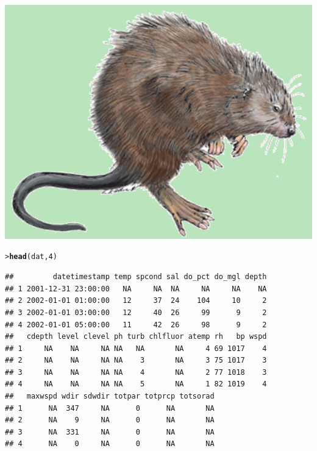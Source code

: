 \documentclass[serif]{beamer}\usepackage[]{graphicx}\usepackage[]{color}
\makeatletter
\newcommand{\hlnum}[1]{\textcolor[rgb]{0.686,0.059,0.569}{#1}}%
\newcommand{\hlstd}[1]{\textcolor[rgb]{0.345,0.345,0.345}{#1}}%
\newcommand{\hlkwd}[1]{\textcolor[rgb]{0.737,0.353,0.396}{\textbf{#1}}}%
\newenvironment{kframe}{%
 \def\at@end@of@kframe{}%
 \ifinner\ifhmode%
  \def\at@end@of@kframe{\end{minipage}}%
  \begin{minipage}{\columnwidth}%
 \fi\fi%
 \def\FrameCommand##1{\hskip\@totalleftmargin \hskip-\fboxsep
 \colorbox{shadecolor}{##1}\hskip-\fboxsep
     \hskip-\linewidth \hskip-\@totalleftmargin \hskip\columnwidth}%
 \MakeFramed {\advance\hsize-\width
   \@totalleftmargin\z@ \linewidth\hsize
   \@setminipage}}%
 {\par\unskip\endMakeFramed%
 \at@end@of@kframe}
\newenvironment{knitrout}{}{} %
\makeatother
\begin{document}
\begin{frame}[fragile]{\includegraphics[width=0.05\paperwidth]{fig/muskrat.png}\hspace{0.07in}{\bf SWMPrats.net: The SWMPr package}}
\begin{knitrout}\small
{}\color{fgcolor}\begin{kframe}
\begin{alltt}
\hlstd{> }\hlkwd{head}\hlstd{(dat,} \hlnum{4}\hlstd{)}
\end{alltt}
\begin{verbatim}
##         datetimestamp temp spcond sal do_pct do_mgl depth
## 1 2001-12-31 23:00:00   NA     NA  NA     NA     NA    NA
## 2 2002-01-01 01:00:00   12     37  24    104     10     2
## 3 2002-01-01 03:00:00   12     40  26     99      9     2
## 4 2002-01-01 05:00:00   11     42  26     98      9     2
##   cdepth level clevel ph turb chlfluor atemp rh   bp wspd
## 1     NA    NA     NA NA   NA       NA     4 69 1017    4
## 2     NA    NA     NA NA    3       NA     3 75 1017    3
## 3     NA    NA     NA NA    4       NA     2 77 1018    3
## 4     NA    NA     NA NA    5       NA     1 82 1019    4
##   maxwspd wdir sdwdir totpar totprcp totsorad
## 1      NA  347     NA      0      NA       NA
## 2      NA    9     NA      0      NA       NA
## 3      NA  331     NA      0      NA       NA
## 4      NA    0     NA      0      NA       NA
\end{verbatim}
\end{kframe}
\end{knitrout}
\end{frame}
\end{document}
